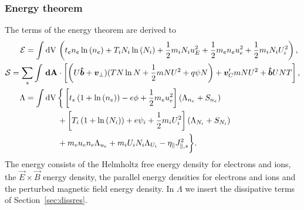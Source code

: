 \subsubsection{Energy theorem}
The terms of the energy theorem are derived to
\begin{align}
  \mathcal{E}= \int  \mathrm{dV}\, & \left( t_e n_e \ln{(n_e)} +T_i N_i\ln{(N_i)}+  \frac{1}{2} m_i N_i u_E^2 +\frac{1}{2} m_e  n_e u_e^2 +\frac{1}{2} m_i  N_i U_i^2  \right),\\
  \mathcal S = \sum_s \int {\boldsymbol{\,\mathrm{dA}}} & \cdot\left[ \left( U\bm{\hat{b}} + {\boldsymbol{v}}_\perp )
  (T N\ln N + \frac{1}{2}m NU^2 + q\psi N \right) + {\boldsymbol{v}}_C' m NU^2 + \bm{\hat{b}} UNT \right], \\
  \Lambda =  \int \mathrm{dV}\, & \bigg\{  \left[t_e\left( 1+\ln{(n_e)}\right) -e \phi + \frac{1}{2} m_e u_e^2 \right](\Lambda_{n_e} + S_{n_e})
  \nonumber\\ &
+\left[T_i\left( 1+\ln{(N_i)}\right) +e \psi_i + \frac{1}{2} m_i U_i^2 \right](\Lambda_{N_i}+S_{N_i})
\nonumber \\ &
+ m_e u_e n_e \Lambda_{u_e}+m_iU_i N_i \Lambda_{U_i} - \eta_\parallel J_{\parallel,s}^2\bigg\}.
\end{align}
The energy consists of the Helmholtz free energy density for electrons and ions, the \(\vec{E} \times \vec{B}\) energy density, the parallel energy densities for electrons and ions and the perturbed magnetic field energy density.
In \(\Lambda\) we insert the dissipative terms of Section~\ref{sec:dissres}. \\
